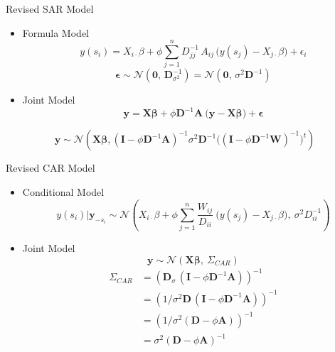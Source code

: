 \documentclass[11pt,ignorenonframetext,]{beamer}
\providecommand{\tightlist}{%
  \setlength{\itemsep}{0pt}\setlength{\parskip}{0pt}}
\begin{document}
\begin{frame}[t]{Revised SAR Model}
\protect\hypertarget{revised-sar-model}{}

\begin{itemize}
\tightlist
\item
  Formula Model
  \[ y(s_i) = X_{i\cdot}\beta + \phi \sum_{j=1}^n D^{-1}_{jj} \, A_{ij} \, \big(y(s_j) - X_{j\cdot}\beta\big) + \epsilon_i \]
  \[ \symbf{\epsilon} \sim \mathcal{N}(\symbf{0},\,\symbf{D}_{\sigma^2}^{-1}) =  \mathcal{N}(\symbf{0},\, \sigma^2 \symbf{D}^{-1}) \]
\item
  Joint Model \pause
  \[\symbf{y} = \symbf{X}\symbf{\beta} + \phi \symbf{D}^{-1} \symbf{A} ~\big(\symbf{y}-\symbf{X}\symbf{\beta}\big) + \symbf{\epsilon}
  \]
\end{itemize}

\pause
\vfill

\[
\symbf{y} \sim \mathcal{N}\left(\symbf{X}\symbf{\beta}, (\symbf{I} - \phi \symbf{D}^{-1} \symbf{A})^{-1} \sigma^2 \symbf{D}^{-1} \big((\symbf{I} - \phi \symbf{D}^{-1} \symbf{W})^{-1}\big)^t \right)
\] \vfill

\end{frame}

\begin{frame}[t]{Revised CAR Model}
\protect\hypertarget{revised-car-model}{}

\begin{itemize}
\item
  Conditional Model
  \[ y(s_i)|\symbf{y}_{-s_i} \sim \mathcal{N}\left(X_{i\cdot}\beta + \phi\sum_{j=1}^n \frac{W_{ij}}{D_{ii}} ~ \big(y(s_j)-X_{j\cdot}\beta\big),~ \sigma^2 D^{-1}_{ii} \right) \]
\item
  Joint Model \pause
  \[\symbf{y} \sim \mathcal{N}(\symbf{X}\symbf{\beta},~\Sigma_{CAR})\]
  \pause \[ \begin{aligned}
  \Sigma_{CAR}
  &= (\symbf{D}_{\sigma} \, (\symbf{I}-\phi \symbf{D}^{-1}\symbf{A}))^{-1} \\
  &= (1/\sigma^2 \symbf{D} \, (\symbf{I}-\phi \symbf{D}^{-1}\symbf{A}))^{-1} \\
  &= (1/\sigma^2 (\symbf{D}-\phi \symbf{A}))^{-1} \\
  &= \sigma^2(\symbf{D}-\phi \symbf{A})^{-1}
  \end{aligned}
  \]
\end{itemize}

\end{frame}
\end{document}
